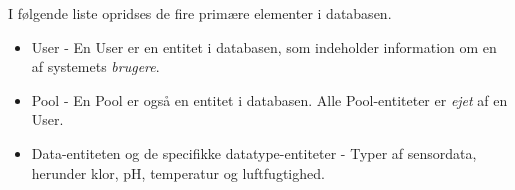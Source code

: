 I følgende liste opridses de fire primære elementer i databasen.

\begin{itemize}
	\item User - En User er en entitet i databasen, som indeholder information om en af systemets \textit{brugere}.
	\item Pool - En Pool er også en entitet i databasen. Alle Pool-entiteter er \textit{ejet} af en User.
	\item Data-entiteten og de specifikke datatype-entiteter - Typer af sensordata, herunder klor, pH, temperatur og luftfugtighed.
\end{itemize}


